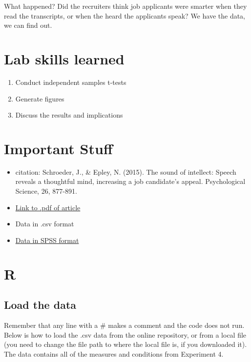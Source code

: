 \documentclass[]{book}
\providecommand{\tightlist}{%
  \setlength{\itemsep}{0pt}\setlength{\parskip}{0pt}}
\begin{document}
What happened? Did the recruiters think job applicants were smarter when
they read the transcripts, or when the heard the applicants speak? We
have the data, we can find out.

\section{Lab skills learned}\label{lab-skills-learned-1}

\begin{enumerate}
\def\labelenumi{\arabic{enumi}.}
\tightlist
\item
  Conduct independent samples t-tests
\item
  Generate figures
\item
  Discuss the results and implications
\end{enumerate}

\section{Important Stuff}\label{important-stuff-1}

\begin{itemize}
\tightlist
\item
  citation: Schroeder, J., \& Epley, N. (2015). The sound of intellect:
  Speech reveals a thoughtful mind, increasing a job candidate's appeal.
  Psychological Science, 26, 877-891.
\item
  \href{http://journals.sagepub.com/stoken/default+domain/PhtK6MPtXvkgnYRrnGbA/full}{Link
  to .pdf of article}
\item
  Data in .csv format
\item
  \href{https://drive.google.com/open?id=0Bz-rhZ21ShvOVXlDMjEzQU1oY1k}{Data
  in SPSS format}
\end{itemize}

\section{R}\label{r-7}

\subsection{Load the data}\label{load-the-data-1}

Remember that any line with a \# makes a comment and the code does not
run. Below is how to load the .csv data from the online repository, or
from a local file (you need to change the file path to where the local
file is, if you downloaded it). The data contains all of the measures
and conditions from Experiment 4.
\end{document}
